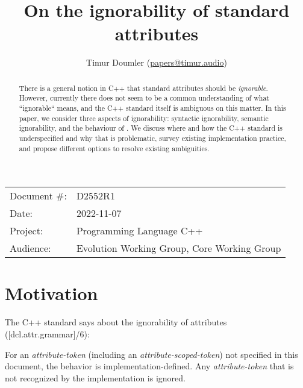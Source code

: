 

\newcommand{\forceindent}{\parindent=1em\indent\parindent=0pt\relax} %


\title{On the ignorability of standard attributes}
\author{
  Timur Doumler \small(\href{mailto:papers@timur.audio}{papers@timur.audio})
}
\date{}
\maketitle

\begin{tabular}{ll}
Document \#: & D2552R1 \\
Date: & 2022-11-07\\
Project: & Programming Language C++ \\
Audience: & Evolution Working Group, Core Working Group
\end{tabular}


\begin{abstract}
There is a general notion in C++ that standard attributes should be \emph{ignorable}. However, currently there does not seem to be a common understanding of what ``ignorable`` means, and the C++ standard itself is ambiguous on this matter. In this paper, we consider three aspects of ignorability: syntactic ignorability, semantic ignorability, and the behaviour of \mbox{}. We discuss where and how the C++ standard is underspecified and why that is problematic, survey existing implementation practice, and propose different options to resolve existing ambiguities.
\end{abstract}


\section{Motivation}
\label{sec:motivation}


The C++ standard says about the ignorability of attributes ([dcl.attr.grammar]/6):

\begin{adjustwidth}{0.5cm}{0.5cm}
For an \emph{attribute-token} (including an \emph{attribute-scoped-token})  not specified in this document, the behavior is implementation-defined. Any \emph{attribute-token} that is not recognized by the implementation is ignored.
\end{adjustwidth}

